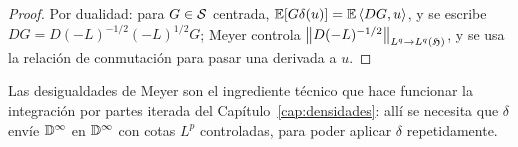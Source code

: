 \begin{proof}
Por dualidad: para $G\in\mathcal{S}$ centrada, $\mathbb{E}[G\delta(u)]=\mathbb{E}\left\langle DG, u\right\rangle$, y se escribe $DG=
D(-L)^{-1/2}(-L)^{1/2}G$; Meyer controla $\left\lVert D(-L)^{-1/2}\right\rVert_{L^q\to L^q(\mathfrak{H})}$, y se usa la relación de conmutación
para pasar una derivada a $u$.
\end{proof}

\begin{observacion}
Las desigualdades de Meyer son el ingrediente técnico que hace funcionar la
integración por partes iterada del Capítulo~\ref{cap:densidades}: allí se necesita que $\delta$ envíe $\mathbb{D}^\infty$ en $\mathbb{D}^\infty$ con cotas
$L^p$ controladas, para poder aplicar $\delta$ repetidamente.
\end{observacion}
